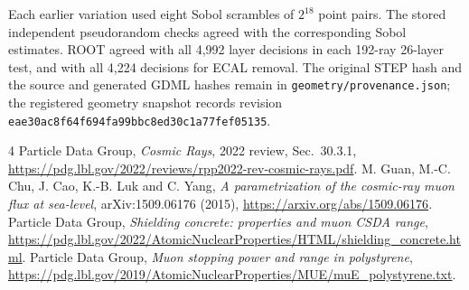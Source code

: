 Each earlier variation used eight Sobol scrambles of $2^{18}$ point pairs.
The stored independent pseudorandom checks agreed with the corresponding
Sobol estimates. ROOT agreed with all 4,992 layer decisions in each 192-ray
26-layer test, and with all 4,224 decisions for ECAL removal. The original
STEP hash and the source and generated GDML hashes remain in
\texttt{geometry/provenance.json}; the registered geometry snapshot records
revision \texttt{eae30ac8f64f694fa99bbc8ed30c1a77fef05135}.

\begin{thebibliography}{4}
 Particle Data Group, \emph{Cosmic Rays}, 2022 review,
Sec.~30.3.1, \url{https://pdg.lbl.gov/2022/reviews/rpp2022-rev-cosmic-rays.pdf}.
 M. Guan, M.-C. Chu, J. Cao, K.-B. Luk and C. Yang,
\emph{A parametrization of the cosmic-ray muon flux at sea-level},
arXiv:1509.06176 (2015), \url{https://arxiv.org/abs/1509.06176}.
 Particle Data Group, \emph{Shielding concrete:
properties and muon CSDA range},
\url{https://pdg.lbl.gov/2022/AtomicNuclearProperties/HTML/shielding_concrete.html}.
 Particle Data Group, \emph{Muon stopping power and range in
polystyrene},
\url{https://pdg.lbl.gov/2019/AtomicNuclearProperties/MUE/muE_polystyrene.txt}.
\end{thebibliography}
